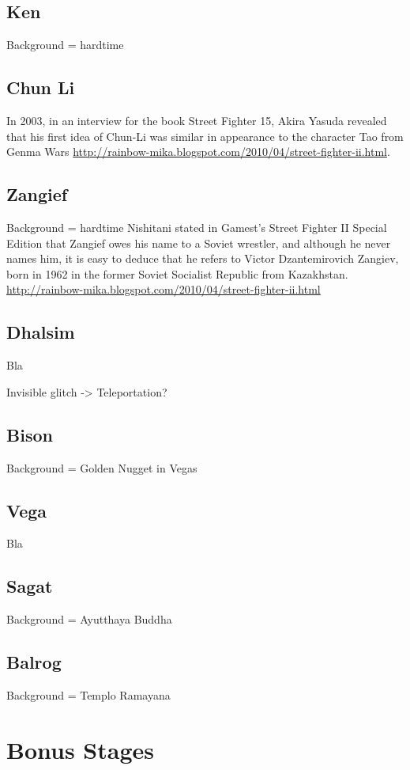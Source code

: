 \subsection{Ken}
Background = hardtime
\subsection{Chun Li} 

In 2003, in an interview for the book Street Fighter 15, Akira Yasuda revealed that his first idea of Chun-Li was similar in appearance to the character Tao from Genma Wars \url{http://rainbow-mika.blogspot.com/2010/04/street-fighter-ii.html}.

\subsection{Zangief} 
Background = hardtime
Nishitani stated in Gamest's Street Fighter II Special Edition that Zangief owes his name to a Soviet wrestler, and although he never names him, it is easy to deduce that he refers to Victor Dzantemirovich Zangiev, born in 1962 in the former Soviet Socialist Republic from Kazakhstan. \url{http://rainbow-mika.blogspot.com/2010/04/street-fighter-ii.html}

\subsection{Dhalsim} Bla

Invisible glitch -> Teleportation?\cite{dalhsimGlitch}

\subsection{Bison} 
Background = Golden Nugget in Vegas
\subsection{Vega} Bla
\subsection{Sagat} 
Background = Ayutthaya Buddha
\subsection{Balrog}
Background = Templo Ramayana

\section{Bonus Stages}
